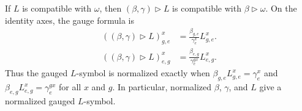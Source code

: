\begin{lemma}
    \label{thm:mpug_l_gauge_preservation}
    \leanok
    If $L$ is compatible with $\omega$, then
    $(\beta,\gamma)\mathbin{\triangleright}L$ is compatible with
    $\beta\mathbin{\triangleright}\omega$. On the identity axes, the gauge
    formula is
    \begin{align}
        ((\beta,\gamma)\mathbin{\triangleright}L)^x_{g,e}
         & =\frac{\beta_{g,e}}{\gamma^x_e}L^x_{g,e}.
        \label{eq:mpug_l_gauge_right}
    \end{align}
    \begin{align}
        ((\beta,\gamma)\mathbin{\triangleright}L)^x_{e,g}
         & =\frac{\beta_{e,g}}{\gamma^{g x}_e}L^x_{e,g}.
        \label{eq:mpug_l_gauge_left}
    \end{align}
    Thus the gauged $L$-symbol is normalized exactly when
    $\beta_{g,e}L^x_{g,e}=\gamma^x_e$ and
    $\beta_{e,g}L^x_{e,g}=\gamma^{g x}_e$ for all $x$ and $g$. In particular,
    normalized $\beta$, $\gamma$, and $L$ give a normalized gauged $L$-symbol.
\end{lemma}
